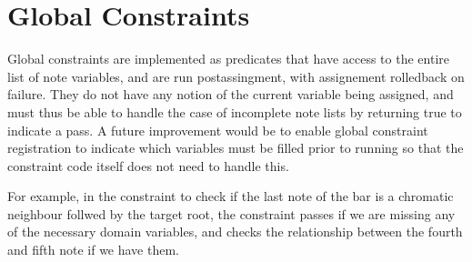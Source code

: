 \documentclass[letterpaper,10pt,english]{sphinxmanual}
\begin{document}
\chapter{Global Constraints}
\label{\detokenize{index:global-constraints}}
\sphinxAtStartPar
Global constraints are implemented as predicates that have access to the entire
list of note variables, and are run post\sphinxhyphen{}assingment, with assignement rolled\sphinxhyphen{}back on failure.
They do not have any notion of the current variable being assigned, and
must thus be able to handle the case of incomplete note lists by returning true
to indicate a pass.
A future improvement would be to enable global constraint registration to indicate
which variables must be filled prior to running so that the constraint code
itself does not need to handle this.

\sphinxAtStartPar
For example, in the constraint to check if the last note of the bar is a chromatic
neighbour follwed by the target root, the constraint passes if we are missing any of the necessary domain variables,
and checks the relationship between the fourth and fifth note if we have them.

\begin{sphinxVerbatim}[commandchars=\\\{\}]
\end{sphinxVerbatim}
\end{document}
